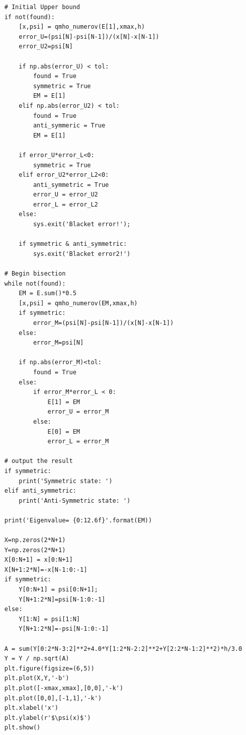 \begin{verbatim}
    # Initial Upper bound
    if not(found):   
        [x,psi] = qmho_numerov(E[1],xmax,h)
        error_U=(psi[N]-psi[N-1])/(x[N]-x[N-1])
        error_U2=psi[N]

        if np.abs(error_U) < tol:
            found = True
            symmetric = True
            EM = E[1]
        elif np.abs(error_U2) < tol:
            found = True
            anti_symmeric = True
            EM = E[1]

        if error_U*error_L<0:
            symmetric = True
        elif error_U2*error_L2<0:
            anti_symmetric = True
            error_U = error_U2
            error_L = error_L2
        else:
            sys.exit('Blacket error!');   

        if symmetric & anti_symmetric:
            sys.exit('Blacket error2!')
    
    # Begin bisection
    while not(found):
        EM = E.sum()*0.5
        [x,psi] = qmho_numerov(EM,xmax,h)
        if symmetric:
            error_M=(psi[N]-psi[N-1])/(x[N]-x[N-1])
        else:
            error_M=psi[N]

        if np.abs(error_M)<tol:
            found = True
        else:
            if error_M*error_L < 0:
                E[1] = EM
                error_U = error_M
            else:
                E[0] = EM
                error_L = error_M

    # output the result
    if symmetric:
        print('Symmetric state: ')
    elif anti_symmetric:
        print('Anti-Symmetric state: ')

    print('Eigenvalue= {0:12.6f}'.format(EM))

    X=np.zeros(2*N+1)
    Y=np.zeros(2*N+1)
    X[0:N+1] = x[0:N+1]
    X[N+1:2*N]=-x[N-1:0:-1]
    if symmetric:
        Y[0:N+1] = psi[0:N+1];
        Y[N+1:2*N]=psi[N-1:0:-1]
    else:
        Y[1:N] = psi[1:N]
        Y[N+1:2*N]=-psi[N-1:0:-1]

    A = sum(Y[0:2*N-3:2]**2+4.0*Y[1:2*N-2:2]**2+Y[2:2*N-1:2]**2)*h/3.0
    Y = Y / np.sqrt(A)
    plt.figure(figsize=(6,5))
    plt.plot(X,Y,'-b')
    plt.plot([-xmax,xmax],[0,0],'-k')
    plt.plot([0,0],[-1,1],'-k')
    plt.xlabel('x')
    plt.ylabel(r'$\psi(x)$')
    plt.show()
\end{verbatim}
\normalsize


